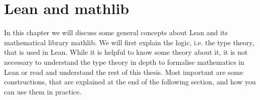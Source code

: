 \chapter{Lean and mathlib}

In this chapter we will discuss some general concepts about Lean and its mathematical library mathlib. 
We will first explain the logic, i.e. the type theory, that is used in Lean. 
While it is helpful to know some theory about it, it is not necessary to understand the type theory in depth to formalise mathematics in Lean or read and understand the rest of this thesis. 
Most important are some constructions, that are explained at the end of the following section, and how you can use them in practice.



